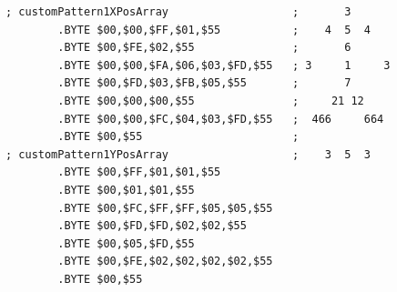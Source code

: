 \begin{lstlisting}
; customPattern1XPosArray                   ;       3      
        .BYTE $00,$00,$FF,$01,$55           ;    4  5  4   
        .BYTE $00,$FE,$02,$55               ;       6      
        .BYTE $00,$00,$FA,$06,$03,$FD,$55   ; 3     1     3
        .BYTE $00,$FD,$03,$FB,$05,$55       ;       7      
        .BYTE $00,$00,$00,$55               ;     21 12    
        .BYTE $00,$00,$FC,$04,$03,$FD,$55   ;  466     664 
        .BYTE $00,$55                       ;              
; customPattern1YPosArray                   ;    3  5  3   
        .BYTE $00,$FF,$01,$01,$55
        .BYTE $00,$01,$01,$55
        .BYTE $00,$FC,$FF,$FF,$05,$05,$55
        .BYTE $00,$FD,$FD,$02,$02,$55
        .BYTE $00,$05,$FD,$55
        .BYTE $00,$FE,$02,$02,$02,$02,$55
        .BYTE $00,$55


\end{lstlisting}


